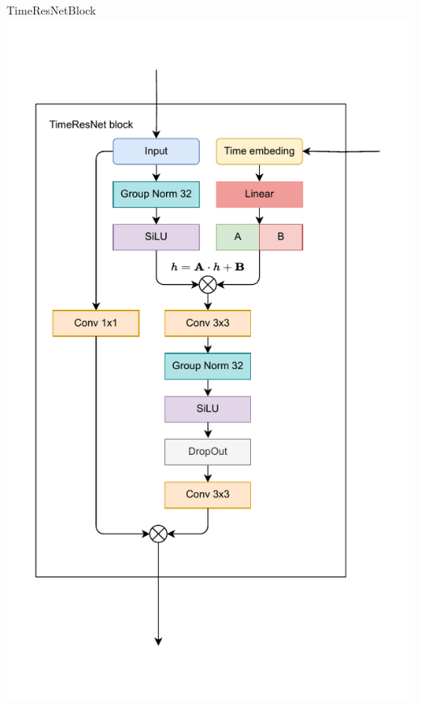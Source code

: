 \documentclass[11pt]{beamer}
\begin{document}
\begin{frame}{TimeResNetBlock}
\centering
\includegraphics[scale=0.5]{images/Embeding.pdf}
\end{frame}
\end{document}
